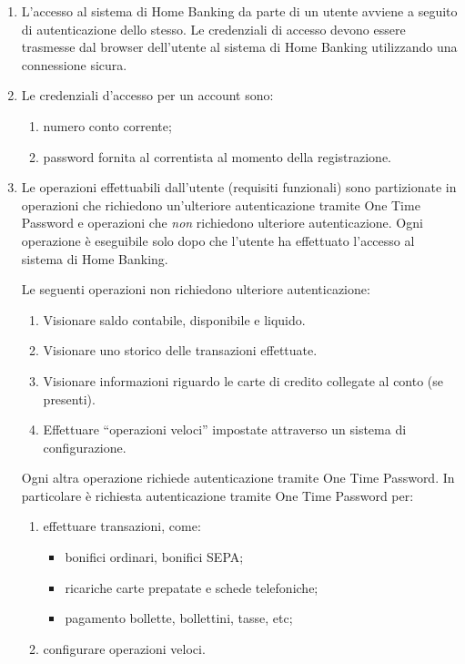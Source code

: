 \begin{enumerate}
	\item L'accesso al sistema di Home Banking da parte di un utente avviene a seguito di autenticazione dello stesso.
		Le credenziali di accesso devono essere trasmesse dal browser dell'utente al sistema di Home Banking utilizzando una connessione sicura.
	\item Le credenziali d'accesso per un account sono:
		\begin{enumerate}
			\item numero conto corrente;
			\item password fornita al correntista al momento della registrazione.
		\end{enumerate}
	\item Le operazioni effettuabili dall'utente (requisiti funzionali) sono partizionate in operazioni che richiedono un'ulteriore autenticazione tramite One Time Password e operazioni che \emph{non} richiedono ulteriore autenticazione.
	Ogni operazione \`e eseguibile solo dopo che l'utente ha effettuato l'accesso al sistema di Home Banking.

	Le seguenti operazioni non richiedono ulteriore autenticazione:
	\begin{enumerate}
		\item Visionare saldo contabile, disponibile e liquido.
		\item Visionare uno storico delle transazioni effettuate.
		\item Visionare informazioni riguardo le carte di credito collegate al conto (se presenti).
		\item Effettuare ``operazioni veloci'' impostate attraverso un sistema di configurazione.
	\end{enumerate}
	
	Ogni altra operazione richiede autenticazione tramite One Time Password.
	In particolare \`e richiesta autenticazione tramite One Time Password per:
	\begin{enumerate}
		\item effettuare transazioni, come:
		\begin{itemize}
			\item bonifici ordinari, bonifici SEPA;
			\item ricariche carte prepatate e schede telefoniche;
			\item pagamento bollette, bollettini, tasse, etc;
		\end{itemize}
		\item configurare operazioni veloci.
	\end{enumerate}
\end{enumerate}

